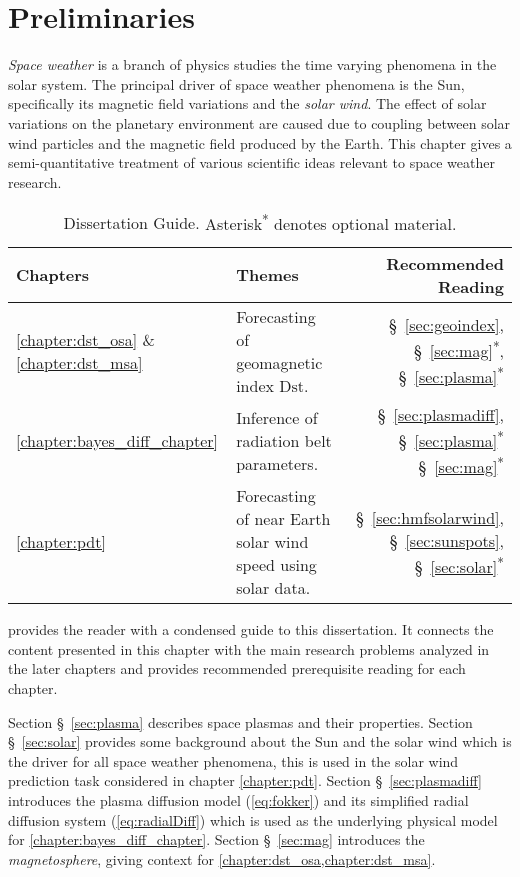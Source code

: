 \chapter{Preliminaries}\label{chapter:preliminaries}

\emph{Space weather} is a branch of physics studies the time varying phenomena in the solar system. 
The principal driver of space weather phenomena is the Sun, specifically its magnetic field 
variations and the \emph{solar wind}. The effect of solar variations on the planetary environment 
are caused due to coupling between solar wind particles and the magnetic field produced by the 
Earth. This chapter gives a semi-quantitative treatment of various scientific ideas relevant to 
space weather research.

\begin{table}
    \centering
    \begin{tabular}{l p{} r}
        \hline
        \textbf{Chapters} & \textbf{Themes} & \textbf{Recommended Reading}\\
        \hline
        \vspace{5pt}
        \ref{chapter:dst_osa} \& \ref{chapter:dst_msa} & Forecasting of geomagnetic index $\mathrm{Dst}$. & \S~\ref{sec:geoindex}, \S~\ref{sec:mag}\textsuperscript{*}, \S~\ref{sec:plasma}\textsuperscript{*} \\
        \ref{chapter:bayes_diff_chapter} & Inference of radiation belt parameters. & \S~\ref{sec:plasmadiff}, \S~\ref{sec:plasma}\textsuperscript{*} \S~\ref{sec:mag}\textsuperscript{*} \\
        \ref{chapter:pdt} & Forecasting of near Earth solar wind speed using solar data. & \S~\ref{sec:hmfsolarwind}, \S~\ref{sec:sunspots}, \S~\ref{sec:solar}\textsuperscript{*}\\
        \hline
    \end{tabular}
    \caption{Dissertation Guide. {\small Asterisk\textsuperscript{*} denotes optional material.}}
    \label{table:chapterguide}
\end{table}

 provides the reader with a condensed guide to this dissertation. 
It connects the content presented in this chapter with the main research problems analyzed in the 
later chapters and provides recommended prerequisite reading for each chapter.

Section \S~\ref{sec:plasma} describes space plasmas and their properties. Section 
\S~\ref{sec:solar} provides some background about the Sun and the solar wind which is the driver 
for all space weather phenomena, this is used in the solar wind prediction task considered in 
chapter \cref{chapter:pdt}. Section \S~\ref{sec:plasmadiff} introduces the plasma diffusion model 
(\cref{eq:fokker}) and its simplified radial diffusion system (\cref{eq:radialDiff}) which is 
used as the underlying physical model for \cref{chapter:bayes_diff_chapter}. Section 
\S~\ref{sec:mag} introduces the \emph{magnetosphere}, giving context for 
\cref{chapter:dst_osa,chapter:dst_msa}. 


